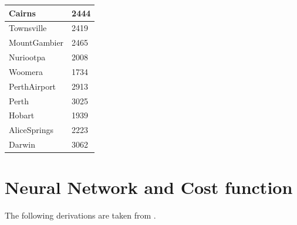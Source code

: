 \documentclass[11pt]{article}
\begin{document}
\begin{table}[H]
\begin{small}
\begin{center}
\begin{tabular}{|l|l|}
                \hline
                Cairns                   & 2444                  \\
                \hline
                Townsville               & 2419                  \\
                \hline
                MountGambier             & 2465                  \\
                \hline
                Nuriootpa                & 2008                  \\
                \hline
                Woomera                  & 1734                  \\
                \hline
                PerthAirport             & 2913                  \\
                \hline
                Perth                    & 3025                  \\
                \hline
                Hobart                   & 1939                  \\
                \hline
                AliceSprings             & 2223                  \\
                \hline
                Darwin                   & 3062                  \\
                \hline
            \end{tabular}
        \end{center}
    \end{small}
\end{table}

\section{Neural Network and Cost function}
\label{app:NN}
The following derivations are taken from \cite{project2}.
\end{document}
